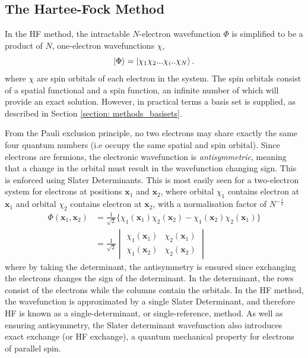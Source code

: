 \subsection{The Hartee-Fock Method}\label{section: methods_HF}
In the \ac{HF} method, the intractable $N$-electron wavefunction $\Phi$ is simplified to be a product of $N$, one-electron wavefunctions $\chi$,
\begin{equation}
\ket{\Phi}=\ket{\chi_{1}\chi_{2}...\chi_{i}..\chi_{N}}.
\end{equation}
 where $\chi$ are spin orbitals of each electron in the system. The spin orbitals consist of a spatial functional and a spin function, an infinite number of which will provide an exact solution. However, in practical terms a basis set is supplied, as described in Section \ref{section: methods_basisets}.
 
 From the Pauli exclusion principle, no two electrons may share exactly the same four quantum numbers (i.e occupy the same spatial and spin orbital). Since electrons are fermions, the electronic wavefunction is \textit{antisymmetric}, meaning that a change in the orbital must result in the wavefunction changing sign. This is enforced using Slater Determinants. This is most easily seen for a two-electron system for electrons at positions $\bm{x}_{1}$ and $\bm{x}_{2}$, where orbital $\chi_{1}$ contains electron at $\bm{x}_1$ and orbital $\chi_{2}$ contains electron at $\bm{x}_2$, with a normalisation factor of $N^{-\frac{1}{2}}$
\begin{equation}
\begin{split}
\Phi(\bm{x}_{1},\bm{x}_{2})&=\frac{1}{\sqrt{2}}\{\chi_{1}(\bm{x}_{1})\chi_{2}(\bm{x}_{2})-\chi_{1}(\bm{x}_{2})\chi_{2}(\bm{x}_{1})\}\\
&=\frac{1}{\sqrt{2}}
\begin{vmatrix}
\chi_{1}(\bm{x}_{1})&\chi_{2}(\bm{x}_{1})\\
\chi_{1}(\bm{x}_{2})&\chi_{2}(\bm{x}_{2})
\end{vmatrix}
\end{split}
\end{equation}
where by taking the determinant, the antisymmetry is ensured since exchanging the electrons changes the sign of the determinant. In the determinant, the rows consist of the electrons while the columns contain the orbitals. In the \ac{HF} method, the wavefunction is approximated by a single Slater Determinant, and therefore \ac{HF} is known as a single-determinant, or single-reference, method.  As well as ensuring antisymmetry, the Slater determinant wavefunction also introduces exact exchange (or HF exchange), a quantum mechanical property for electrons of parallel spin.

